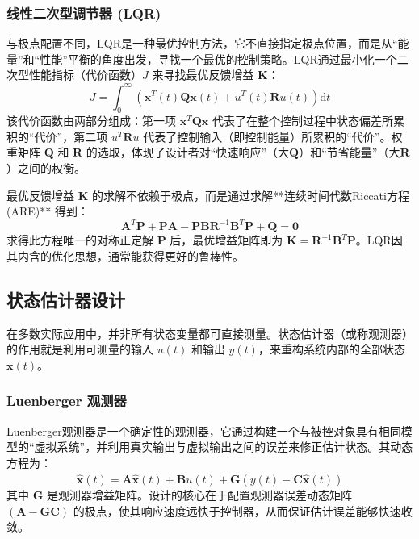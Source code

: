 \documentclass[12pt, a4paper]{article}
\begin{document}
\subsubsection{线性二次型调节器 (LQR)}
与极点配置不同，LQR是一种最优控制方法，它不直接指定极点位置，而是从“能量”和“性能”平衡的角度出发，寻找一个最优的控制策略。LQR通过最小化一个二次型性能指标（代价函数）$J$ 来寻找最优反馈增益 $\bm{K}$：
\begin{equation}
    J = \int_{0}^{\infty} \left( \bm{x}^T(t)\bm{Q}\bm{x}(t) + u^T(t)\bm{R}u(t) \right) \mathrm{d}t
    \label{eq:lqr_cost}
\end{equation}
该代价函数由两部分组成：第一项 $\bm{x}^T\bm{Q}\bm{x}$ 代表了在整个控制过程中状态偏差所累积的“代价”，第二项 $u^T\bm{R}u$ 代表了控制输入（即控制能量）所累积的“代价”。权重矩阵 $\bm{Q}$ 和 $\bm{R}$ 的选取，体现了设计者对“快速响应”（大$\bm{Q}$）和“节省能量”（大$\bm{R}$）之间的权衡。

最优反馈增益 $\bm{K}$ 的求解不依赖于极点，而是通过求解**连续时间代数Riccati方程 (ARE)** 得到：
\begin{equation}
    \bm{A}^T\bm{P} + \bm{P}\bm{A} - \bm{P}\bm{B}\bm{R}^{-1}\bm{B}^T\bm{P} + \bm{Q} = \bm{0}
    \label{eq:are}
\end{equation}
求得此方程唯一的对称正定解 $\bm{P}$ 后，最优增益矩阵即为 $\bm{K} = \bm{R}^{-1}\bm{B}^T\bm{P}$。LQR因其内含的优化思想，通常能获得更好的鲁棒性。

\subsection{状态估计器设计}
在多数实际应用中，并非所有状态变量都可直接测量。状态估计器（或称观测器）的作用就是利用可测量的输入 $u(t)$ 和输出 $y(t)$，来重构系统内部的全部状态 $\bm{x}(t)$。

\subsubsection{Luenberger 观测器}
Luenberger观测器是一个确定性的观测器，它通过构建一个与被控对象具有相同模型的“虚拟系统”，并利用真实输出与虚拟输出之间的误差来修正估计状态。其动态方程为：
\begin{equation}
    \dot{\hat{\bm{x}}}(t) = \bm{A}\hat{\bm{x}}(t) + \bm{B}u(t) + \bm{G}(y(t) - \bm{C}\hat{\bm{x}}(t))
    \label{eq:observer}
\end{equation}
其中 $\bm{G}$ 是观测器增益矩阵。设计的核心在于配置观测器误差动态矩阵 $(\bm{A} - \bm{G}\bm{C})$ 的极点，使其响应速度远快于控制器，从而保证估计误差能够快速收敛。
\end{document}

